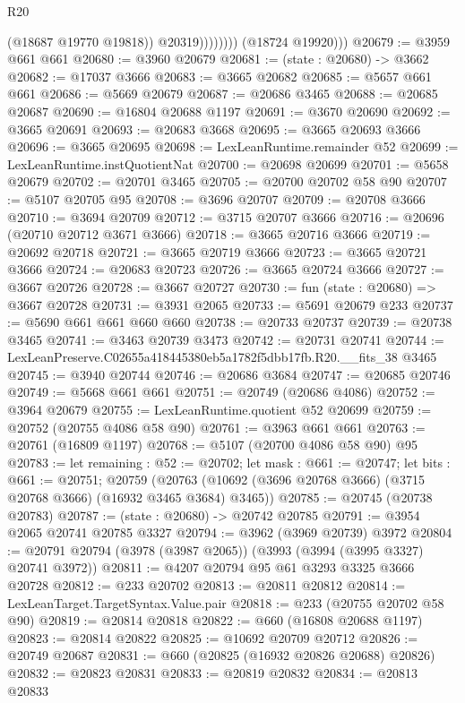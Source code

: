 \begin{lexlean}{R20}
\begin{coremodule}
                          (@18687 @19770 @19818))
                        @20319))))))))
        (@18724 @19920)))
@20679 := @3959 @661 @661
@20680 := @3960 @20679
@20681 := (state : @20680) -> @3662
@20682 := @17037 @3666
@20683 := @3665 @20682
@20685 := @5657 @661 @661
@20686 := @5669 @20679
@20687 := @20686 @3465
@20688 := @20685 @20687
@20690 := @16804 @20688 @1197
@20691 := @3670 @20690
@20692 := @3665 @20691
@20693 := @20683 @3668
@20695 := @3665 @20693 @3666
@20696 := @3665 @20695
@20698 := LexLeanRuntime.remainder @52
@20699 := LexLeanRuntime.instQuotientNat
@20700 := @20698 @20699
@20701 := @5658 @20679
@20702 := @20701 @3465
@20705 := @20700 @20702 @58 @90
@20707 := @5107 @20705 @95
@20708 := @3696 @20707
@20709 := @20708 @3666
@20710 := @3694 @20709
@20712 := @3715 @20707 @3666
@20716 := @20696 (@20710 @20712 @3671 @3666)
@20718 := @3665 @20716 @3666
@20719 := @20692 @20718
@20721 := @3665 @20719 @3666
@20723 := @3665 @20721 @3666
@20724 := @20683 @20723
@20726 := @3665 @20724 @3666
@20727 := @3667 @20726
@20728 := @3667 @20727
@20730 := fun (state : @20680) => @3667 @20728
@20731 := @3931 @2065
@20733 := @5691 @20679 @233
@20737 := @5690 @661 @661 @660 @660
@20738 := @20733 @20737
@20739 := @20738 @3465
@20741 := @3463 @20739 @3473
@20742 := @20731 @20741
@20744 := LexLeanPreserve.C02655a418445380eb5a1782f5dbb17fb.R20.__fits_38 @3465
@20745 := @3940 @20744
@20746 := @20686 @3684
@20747 := @20685 @20746
@20749 := @5668 @661 @661
@20751 := @20749 (@20686 @4086)
@20752 := @3964 @20679
@20755 := LexLeanRuntime.quotient @52 @20699
@20759 := @20752 (@20755 @4086 @58 @90)
@20761 := @3963 @661 @661
@20763 := @20761 (@16809 @1197)
@20768 := @5107 (@20700 @4086 @58 @90) @95
@20783 := let remaining : @52 := @20702;
  let mask : @661 := @20747;
  let bits : @661 := @20751;
  @20759 (@20763 (@10692 (@3696 @20768 @3666) (@3715 @20768 @3666) (@16932 @3465 @3684) @3465))
@20785 := @20745 (@20738 @20783)
@20787 := (state : @20680) -> @20742 @20785
@20791 := @3954 @2065 @20741 @20785 @3327
@20794 := @3962 (@3969 @20739) @3972
@20804 := @20791 @20794 (@3978 (@3987 @2065)) (@3993 (@3994 (@3995 @3327) @20741 @3972))
@20811 := @4207 @20794 @95 @61 @3293 @3325 @3666 @20728
@20812 := @233 @20702
@20813 := @20811 @20812
@20814 := LexLeanTarget.TargetSyntax.Value.pair
@20818 := @233 (@20755 @20702 @58 @90)
@20819 := @20814 @20818
@20822 := @660 (@16808 @20688 @1197)
@20823 := @20814 @20822
@20825 := @10692 @20709 @20712
@20826 := @20749 @20687
@20831 := @660 (@20825 (@16932 @20826 @20688) @20826)
@20832 := @20823 @20831
@20833 := @20819 @20832
@20834 := @20813 @20833

\end{coremodule}
\end{lexlean}
